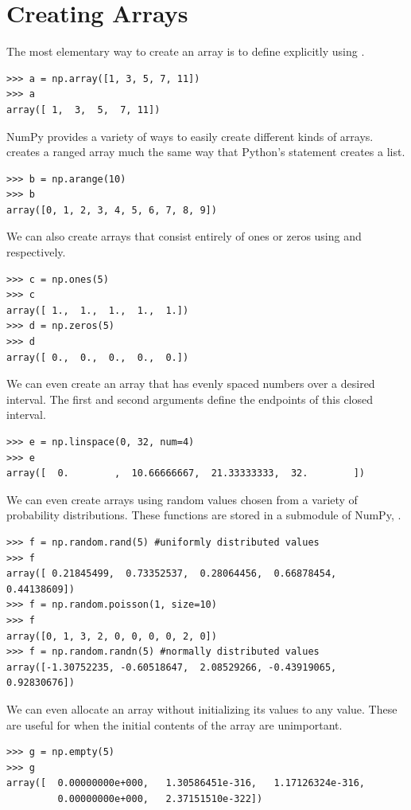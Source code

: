 \section*{Creating Arrays}
The most elementary way to create an array is to define explicitly using .
\begin{lstlisting}
>>> a = np.array([1, 3, 5, 7, 11])
>>> a
array([ 1,  3,  5,  7, 11])
\end{lstlisting}
NumPy provides a variety of ways to easily create different kinds of arrays.
 creates a ranged array much the same way that Python's  statement creates a list.
\begin{lstlisting}
>>> b = np.arange(10)
>>> b
array([0, 1, 2, 3, 4, 5, 6, 7, 8, 9])
\end{lstlisting}
We can also create arrays that consist entirely of ones or zeros using  and  respectively.
\begin{lstlisting}
>>> c = np.ones(5)
>>> c
array([ 1.,  1.,  1.,  1.,  1.])
>>> d = np.zeros(5)
>>> d
array([ 0.,  0.,  0.,  0.,  0.])
\end{lstlisting}
We can even create an array that has evenly spaced numbers over a desired interval.
The first and second arguments define the endpoints of this closed interval.
\begin{lstlisting}
>>> e = np.linspace(0, 32, num=4)
>>> e
array([  0.        ,  10.66666667,  21.33333333,  32.        ])
\end{lstlisting}
We can even create arrays using random values chosen from a variety of probability distributions.
These functions are stored in a submodule of NumPy, .
\begin{lstlisting}
>>> f = np.random.rand(5) #uniformly distributed values
>>> f
array([ 0.21845499,  0.73352537,  0.28064456,  0.66878454,  0.44138609])
>>> f = np.random.poisson(1, size=10)
>>> f
array([0, 1, 3, 2, 0, 0, 0, 0, 2, 0])
>>> f = np.random.randn(5) #normally distributed values
array([-1.30752235, -0.60518647,  2.08529266, -0.43919065,  0.92830676])
\end{lstlisting}
We can even allocate an array without initializing its values to any value.
These are useful for when the initial contents of the array are unimportant.
\begin{lstlisting}
>>> g = np.empty(5)
>>> g
array([  0.00000000e+000,   1.30586451e-316,   1.17126324e-316,
         0.00000000e+000,   2.37151510e-322])
\end{lstlisting}

